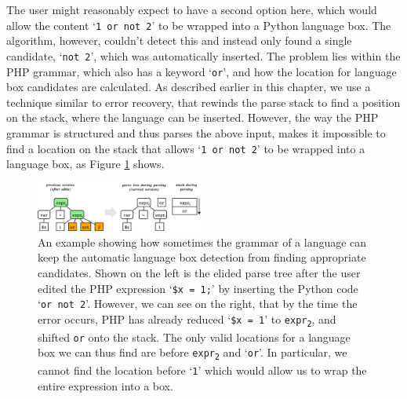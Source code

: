 \documentclass[sigplan,screen]{acmart}\settopmatter{printfolios=true,printccs=false,printacmref=false}
\newcommand{\qtt}[1]{`\texttt{#1}'\xspace}
\begin{document}
The user might reasonably expect to have a second option here, which would
allow the content \qtt{1 or not 2} to be wrapped into a Python language box.
The algorithm, however, couldn't detect this and instead only found a single
candidate, \qtt{not 2}, which was automatically inserted.  The problem lies
within the PHP grammar, which also has a keyword \qtt{or}, and how the location
for language box candidates are calculated. As described earlier in this
chapter, we use a technique similar to error recovery, that rewinds the parse
stack to find a position on the stack, where the language can be inserted.
However, the way the PHP grammar is structured and thus parses the above input,
makes it impossible to find a location on the stack that allows \qtt{1 or not
2} to be wrapped into a language box, as Figure \ref{fig_auto_phplimit} shows.

\begin{figure}
\begin{center}
\includegraphics[width=0.49\textwidth]{images/limitation_php}
\end{center}
\caption{An example showing how sometimes the grammar of a language can
keep the automatic language box detection from finding appropriate candidates.
Shown on the left is the elided parse tree after the user edited the PHP expression
\qtt{\$x = 1;} by inserting the Python code \qtt{or not 2}. However, we
can see on the right, that by the time the error occurs, PHP has already reduced \qtt{\$x = 1} to \texttt{expr\textsubscript{2}}, and shifted
\texttt{or} onto the stack. The only valid locations for a language
box we can thus find are before \texttt{expr\textsubscript{2}} and \qtt{or}. In particular,
we cannot find the location before \qtt{1} which would allow us to wrap the entire expression
into a box.}
\label{fig_auto_phplimit}
\end{figure}
\end{document}
